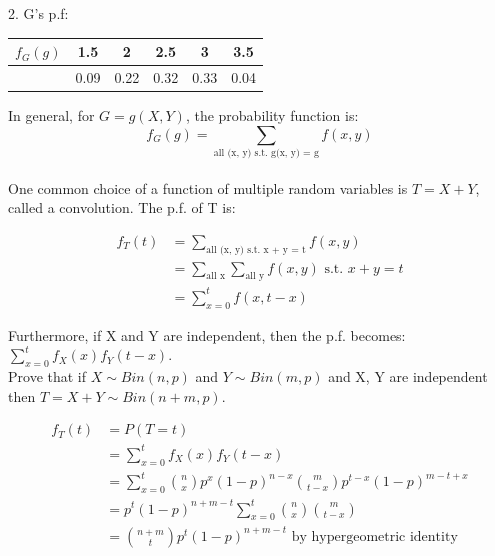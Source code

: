 \documentclass[12pt, letterpaper]{article}
\begin{document}
\vspace{7mm}

2. G's p.f:

\begin{tabular}{|c|c|c|c|c|c|}
\hline
$f_G \left(g\right)$ & 1.5 & 2 & 2.5 & 3 & 3.5\\ 
\hline
& 0.09 & 0.22 & 0.32 & 0.33 & 0.04\\
\hline
\end{tabular}

\vspace{7mm}

In general, for $G = g(X, Y)$, the probability function is:
\begin{equation}
f_G \left(g\right) = \sum_{\text{all (x, y) s.t. g(x, y) = g}} f\left(x, y\right)
\end{equation}\\

One common choice of a function of multiple random variables is $T = X + Y$, called a convolution. The p.f. of T is:

\begin{align*}
f_T \left(t\right) &= \sum_{\text{all (x, y) s.t. x + y = t}} f\left(x, y\right)\\
&= \sum_{\text{all x}} \sum_{\text{all y}} f\left(x, y\right) \text{ s.t. $x + y = t$}\\
&= \sum_{x = 0}^{t} f\left(x, t - x\right)
\end{align*}

Furthermore, if X and Y are independent, then the p.f. becomes: $\sum\limits_{x = 0}^{t} f_X \left(x\right) f_Y \left(t - x\right)$.\\

Prove that if $X \sim Bin(n, p)$ and $Y \sim Bin(m, p)$ and X, Y are independent then $T = X + Y \sim Bin(n + m, p)$.

\begin{align*}
f_T \left(t\right) &= P\left(T = t\right)\\
&= \sum_{x = 0}^{t} f_X \left(x\right) f_Y \left(t - x\right)\\
&= \sum_{x = 0}^{t} {{n} \choose {x}} p^x (1 - p)^{n - x} {{m} \choose {t - x}} p^{t - x} (1 - p)^{m - t + x}\\
&= p^t (1 - p)^{n + m - t} \sum_{x = 0}^{t} {{n} \choose {x}} {{m} \choose {t - x}}\\
&= {{n + m} \choose {t}} p^t (1 - p)^{n + m - t} \text{ by hypergeometric identity}
\end{align*}
\end{document}
